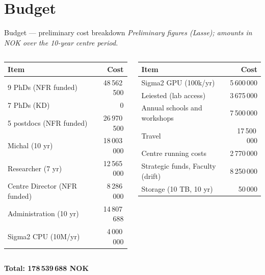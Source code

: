 \documentclass[10pt,aspectratio=169]{beamer}
\begin{document}
\section{Budget}

\begin{frame}{Budget --- preliminary cost breakdown}
  {\footnotesize\itshape Preliminary figures (Lasse); amounts in NOK over the 10-year centre period.}
  \vfill
  \footnotesize
  \setlength{\tabcolsep}{6pt}
  \renewcommand{\arraystretch}{1.15}
  \begin{columns}[T]
    \begin{tabular}{@{}lr@{}}
    \toprule
    \textbf{Item} & \textbf{Cost} \\
    \midrule
    9 PhDs (NFR funded)          & 48\,562\,500 \\
    7 PhDs (KD)                  & 0 \\
    5 postdocs (NFR funded)      & 26\,970\,500 \\
    Michal (10 yr)               & 18\,003\,000 \\
    Researcher (7 yr)            & 12\,565\,000 \\
    Centre Director (NFR funded) & 8\,286\,000 \\
    Administration (10 yr)       & 14\,807\,688 \\
    Sigma2 CPU (10M/yr)          & 4\,000\,000 \\
    \bottomrule
    \end{tabular}

    \begin{tabular}{@{}lr@{}}
    \toprule
    \textbf{Item} & \textbf{Cost} \\
    \midrule
    Sigma2 GPU (100k/yr)             & 5\,600\,000 \\
    Leiested (lab access)            & 3\,675\,000 \\
    Annual schools and workshops     & 7\,500\,000 \\
    Travel                           & 17\,500\,000 \\
    Centre running costs             & 2\,770\,000 \\
    Strategic funds, Faculty (drift) & 8\,250\,000 \\
    Storage (10 TB, 10 yr)           & 50\,000 \\
    \bottomrule
    \end{tabular}
  \end{columns}
  \vfill
  \begin{center}
    \normalsize\textbf{Total: 178\,539\,688 NOK}
  \end{center}
\end{frame}
\end{document}
